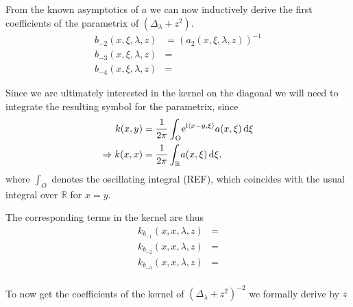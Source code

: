 From the known asymptotics of $a$ we can now inductively derive the first
coefficients of the parametrix of $(\Delta_\lambda + z^2)$.
\begin{align}
    b_{-2}(x,\xi,\lambda,z) &= (a_2(x,\xi,\lambda,z))^{-1} \\
    b_{-3}(x,\xi,\lambda,z) &= \\
    b_{-4}(x,\xi,\lambda,z) &=
    \label{eqn:coeff-symbol}
\end{align}


Since we are ultimately interested in the kernel on the diagonal we will need to
integrate the resulting symbol for the parametrix, since
\begin{align*}
    k(x,y) &= \frac{1}{2\pi}\int_{\mathrm{O}}^{}\!
        \mathrm e^{\mathrm i\left\langle x-y, \xi\right\rangle} a(x,\xi)
        \,\mathrm d{\xi} \\
    \Rightarrow k(x,x) &= \frac{1}{2\pi}\int_{\mathbb{R}}^{}\!a(x,\xi)\,\mathrm d{\xi},
\end{align*}
where $\int_{O}$ denotes the oscillating integral (REF), which coincides with
the usual integral over $\mathbb{R}$ for $x = y$.

The corresponding terms in the kernel are thus
\begin{align}
    k_{b_{-1}}(x,x,\lambda,z) &= \\
    k_{b_{-2}}(x,x,\lambda,z) &= \\
    k_{b_{-3}}(x,x,\lambda,z) &= \\
    \label{eqn:coeff-kernel}
\end{align}

To now get the coefficients of the kernel of $(\Delta_\lambda + z^2)^{-2}$ we
formally derive by $z$


